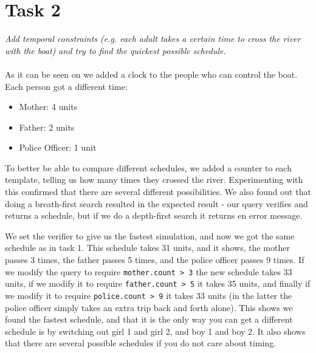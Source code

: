 \section{Task 2}
\label{sec:task2}
\textit{Add temporal constraints (e.g. each adult takes a certain time to cross the river with the boat) and try to find the quickest possible schedule.}\\\\
As it can be seen on  we added a clock to the people who can control the boat. Each person got a different time:

\begin{itemize}
	\item Mother: 4 units
	\item Father: 2 units
	\item Police Officer: 1 unit
\end{itemize}

\noindent To better be able to compare different schedules, we added a counter to each template, telling us how many times they crossed the river. Experimenting with this confirmed that there are several different possibilities. We also found out that doing a breath-first search resulted in the expected result - our query verifies and returns a schedule, but if we do a depth-first search it returns en error message.

\noindent We set the verifier to give us the fastest simulation, and now we got the same schedule as in task 1. This schedule takes 31 units, and it shows, the mother passes 3 times, the father passes 5 times, and the police officer passes 9 times. If we modify the query to require \texttt{mother.count > 3} the new schedule takes 33 units, if we modify it to require \texttt{father.count > 5} it takes 35 units, and finally if we modify it to require \texttt{police.count > 9} it takes 33 units (in the latter the police officer simply takes an extra trip back and forth alone). This shows we found the fastest schedule, and that it is the only way you can get a different schedule is by switching out girl 1 and girl 2, and boy 1 and boy 2. It also shows that there are several possible schedules if you do not care about timing.